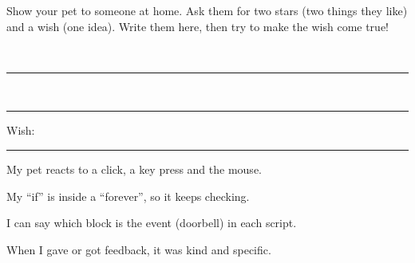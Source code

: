 \begin{creative}
Show your pet to someone at home. Ask them for two stars (two things they like) and a wish (one idea). Write them here, then try to make the wish come true!
\par\faStar\ \rule{0.8\linewidth}{0.4pt}
\par\faStar\ \rule{0.8\linewidth}{0.4pt}
\par Wish: \rule{0.75\linewidth}{0.4pt}
\end{creative}

\begin{selfcheck}
  \item My pet reacts to a click, a key press and the mouse.
  \item My \enquote{if} is inside a \enquote{forever}, so it keeps checking.
  \item I can say which block is the event (doorbell) in each script.
  \item When I gave or got feedback, it was kind and specific.
\end{selfcheck}
